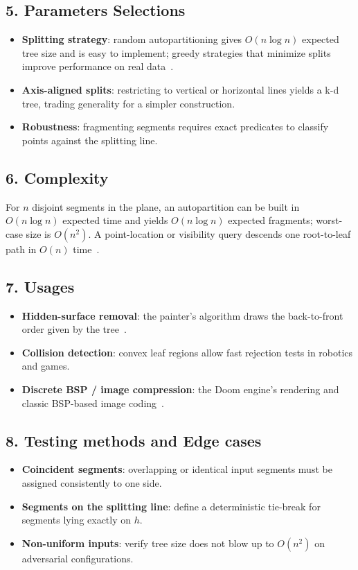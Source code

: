 \subsection{5. Parameters Selections}
\begin{itemize}
    \item \textbf{Splitting strategy}: random autopartitioning gives $O(n \log n)$ expected tree size and is easy to implement; greedy strategies that minimize splits improve performance on real data~\cite{naylor1990}.
    \item \textbf{Axis-aligned splits}: restricting to vertical or horizontal lines yields a k-d tree, trading generality for a simpler construction.
    \item \textbf{Robustness}: fragmenting segments requires exact predicates to classify points against the splitting line.
\end{itemize}

\subsection{6. Complexity}
For $n$ disjoint segments in the plane, an autopartition can be built in $O(n \log n)$ expected time and yields $O(n \log n)$ expected fragments; worst-case size is $O(n^2)$. A point-location or visibility query descends one root-to-leaf path in $O(n)$ time~\cite{berg2008,fuchs1980}.

\subsection{7. Usages}
\begin{itemize}
    \item \textbf{Hidden-surface removal}: the painter's algorithm draws the back-to-front order given by the tree~\cite{fuchs1980}.
    \item \textbf{Collision detection}: convex leaf regions allow fast rejection tests in robotics and games.
    \item \textbf{Discrete BSP / image compression}: the Doom engine's rendering and classic BSP-based image coding~\cite{naylor1990}.
\end{itemize}

\subsection{8. Testing methods and Edge cases}
\begin{itemize}
    \item \textbf{Coincident segments}: overlapping or identical input segments must be assigned consistently to one side.
    \item \textbf{Segments on the splitting line}: define a deterministic tie-break for segments lying exactly on $h$.
    \item \textbf{Non-uniform inputs}: verify tree size does not blow up to $O(n^2)$ on adversarial configurations.
\end{itemize}

